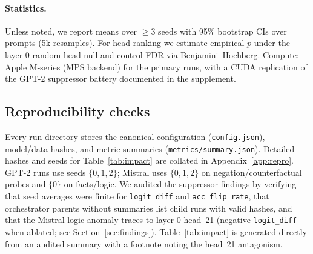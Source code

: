 \paragraph{Statistics.}
Unless noted, we report means over $\geq$3 seeds with 95\% bootstrap CIs over prompts (5k resamples). For head ranking we estimate empirical $p$ under the layer-0 random-head null and control FDR via Benjamini–Hochberg. Compute: Apple M-series (MPS backend) for the primary runs, with a CUDA replication of the GPT-2 suppressor battery documented in the supplement.

\subsection{Reproducibility checks}
Every run directory stores the canonical configuration (\texttt{config.json}), model/data hashes, and metric summaries (\texttt{metrics/summary.json}). Detailed hashes and seeds for Table~\ref{tab:impact} are collated in Appendix~\ref{app:repro}. GPT-2 runs use seeds $\{0,1,2\}$; Mistral uses $\{0,1,2\}$ on negation/counterfactual probes and $\{0\}$ on facts/logic.
We audited the suppressor findings by verifying that seed averages were finite for \texttt{logit\_diff} and \texttt{acc\_flip\_rate}, that orchestrator parents without summaries list child runs with valid hashes, and that the Mistral logic anomaly traces to layer-0 head~21 (negative \texttt{logit\_diff} when ablated; see Section~\ref{sec:findings}). Table~\ref{tab:impact} is generated directly from an audited summary with a footnote noting the head~21 antagonism.

